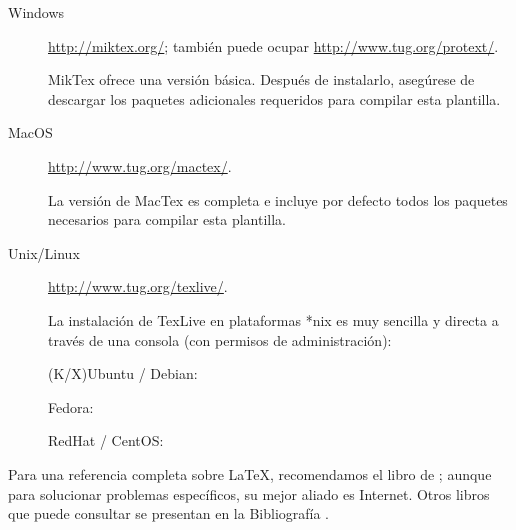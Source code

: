 \begin{description}
\item [Windows] \href{http://miktex.org/}{http://miktex.org/}; también puede
ocupar \href{http://www.tug.org/protext/}{http://www.tug.org/protext/}.

MikTex ofrece una versión básica. Después de instalarlo, asegúrese de descargar los paquetes adicionales requeridos para compilar esta plantilla.

\item [MacOS] \href{http://www.tug.org/mactex/}{http://www.tug.org/mactex/}.

La versión de MacTex es completa e incluye por defecto todos los paquetes necesarios para compilar esta plantilla.

\item [Unix/Linux] \href{http://www.tug.org/texlive/}{http://www.tug.org/texlive/}.

La instalación de TexLive en plataformas *nix es muy sencilla y directa a través de una consola (con permisos de administración):

(K/X)Ubuntu / Debian: 

Fedora: 

RedHat / CentOS: 
\end{description}

Para una referencia completa sobre \LaTeX{}, recomendamos el libro
de \parencite{Lamport94}; aunque para solucionar problemas específicos,
su mejor aliado es Internet. Otros libros que puede consultar se presentan
en la Bibliografía \parencites{Mittelbach04}{Oetiker06}{Roberts05}{Borbon2014}. %


